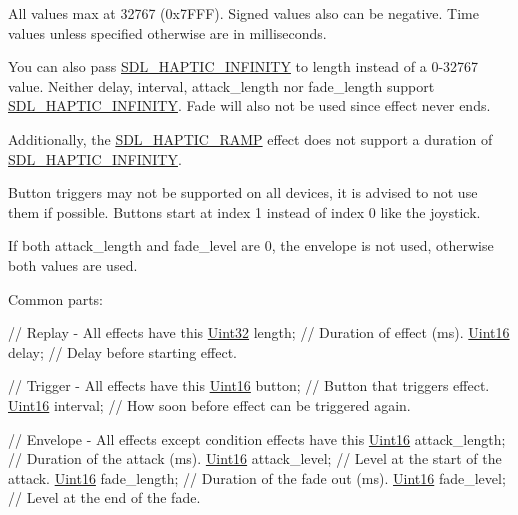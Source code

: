 All values max at 32767 (0x7\+F\+F\+F). Signed values also can be negative. Time values unless specified otherwise are in milliseconds.

You can also pass \hyperlink{SDL__haptic_8h_a648896e9e14cb27fa8a4b6632d3f3882}{S\+D\+L\+\_\+\+H\+A\+P\+T\+I\+C\+\_\+\+I\+N\+F\+I\+N\+I\+T\+Y} to length instead of a 0-\/32767 value. Neither delay, interval, attack\+\_\+length nor fade\+\_\+length support \hyperlink{SDL__haptic_8h_a648896e9e14cb27fa8a4b6632d3f3882}{S\+D\+L\+\_\+\+H\+A\+P\+T\+I\+C\+\_\+\+I\+N\+F\+I\+N\+I\+T\+Y}. Fade will also not be used since effect never ends.

Additionally, the \hyperlink{SDL__haptic_8h_af10eb937a64a8f602e9c46682ac0d868}{S\+D\+L\+\_\+\+H\+A\+P\+T\+I\+C\+\_\+\+R\+A\+M\+P} effect does not support a duration of \hyperlink{SDL__haptic_8h_a648896e9e14cb27fa8a4b6632d3f3882}{S\+D\+L\+\_\+\+H\+A\+P\+T\+I\+C\+\_\+\+I\+N\+F\+I\+N\+I\+T\+Y}.

Button triggers may not be supported on all devices, it is advised to not use them if possible. Buttons start at index 1 instead of index 0 like the joystick.

If both attack\+\_\+length and fade\+\_\+level are 0, the envelope is not used, otherwise both values are used.

Common parts\+: 
\begin{DoxyCode}
\textcolor{comment}{// Replay - All effects have this}
\hyperlink{SDL__stdinc_8h_add440eff171ea5f55cb00c4a9ab8672d}{Uint32} length;        \textcolor{comment}{// Duration of effect (ms).}
\hyperlink{SDL__stdinc_8h_a31fcc0a076c9068668173ee26d33e42b}{Uint16} delay;         \textcolor{comment}{// Delay before starting effect.}

\textcolor{comment}{// Trigger - All effects have this}
\hyperlink{SDL__stdinc_8h_a31fcc0a076c9068668173ee26d33e42b}{Uint16} button;        \textcolor{comment}{// Button that triggers effect.}
\hyperlink{SDL__stdinc_8h_a31fcc0a076c9068668173ee26d33e42b}{Uint16} interval;      \textcolor{comment}{// How soon before effect can be triggered again.}

\textcolor{comment}{// Envelope - All effects except condition effects have this}
\hyperlink{SDL__stdinc_8h_a31fcc0a076c9068668173ee26d33e42b}{Uint16} attack\_length; \textcolor{comment}{// Duration of the attack (ms).}
\hyperlink{SDL__stdinc_8h_a31fcc0a076c9068668173ee26d33e42b}{Uint16} attack\_level;  \textcolor{comment}{// Level at the start of the attack.}
\hyperlink{SDL__stdinc_8h_a31fcc0a076c9068668173ee26d33e42b}{Uint16} fade\_length;   \textcolor{comment}{// Duration of the fade out (ms).}
\hyperlink{SDL__stdinc_8h_a31fcc0a076c9068668173ee26d33e42b}{Uint16} fade\_level;    \textcolor{comment}{// Level at the end of the fade.}
\end{DoxyCode}


